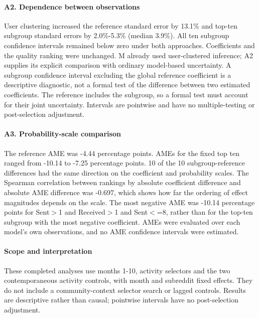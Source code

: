 \paragraph{A2. Dependence between observations}
User clustering increased the reference standard error by 13.1\% and top-ten subgroup standard errors by 2.0\%-5.3\% (median 3.9\%). All ten subgroup confidence intervals remained below zero under both approaches. Coefficients and the quality ranking were unchanged. M already used user-clustered inference; A2 supplies its explicit comparison with ordinary model-based uncertainty. A subgroup confidence interval excluding the global reference coefficient is a descriptive diagnostic, not a formal test of the difference between two estimated coefficients. The reference includes the subgroup, so a formal test must account for their joint uncertainty. Intervals are pointwise and have no multiple-testing or post-selection adjustment.

\paragraph{A3. Probability-scale comparison}
The reference AME was -4.44 percentage points. AMEs for the fixed top ten ranged from -10.14 to -7.25 percentage points. 10 of the 10 subgroup-reference differences had the same direction on the coefficient and probability scales. The Spearman correlation between rankings by absolute coefficient difference and absolute AME difference was -0.697, which shows how far the ordering of effect magnitudes depends on the scale. The most negative AME was -10.14 percentage points for Sent$>$1 and Received$>$1 and Sent$<$=8, rather than for the top-ten subgroup with the most negative coefficient. AMEs were evaluated over each model's own observations, and no AME confidence intervals were estimated.

\paragraph{Scope and interpretation}
These completed analyses use months 1-10, activity selectors and the two contemporaneous activity controls, with month and subreddit fixed effects. They do not include a community-context selector search or lagged controls. Results are descriptive rather than causal; pointwise intervals have no post-selection adjustment.
